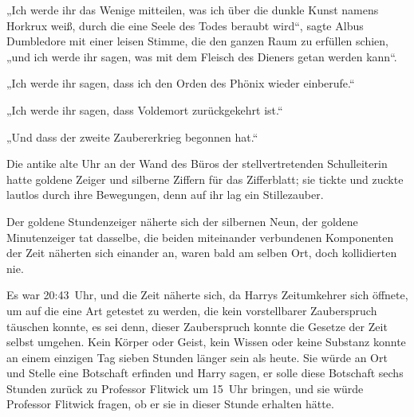 „Ich werde ihr das Wenige mitteilen, was ich über die dunkle Kunst namens Horkrux weiß, durch die eine Seele des Todes beraubt wird“, sagte Albus Dumbledore mit einer leisen Stimme, die den ganzen Raum zu erfüllen schien, „und ich werde ihr sagen, was mit dem Fleisch des Dieners getan werden kann“.

„Ich werde ihr sagen, dass ich den Orden des Phönix wieder einberufe.“

„Ich werde ihr sagen, dass Voldemort zurückgekehrt ist.“

„Und dass der zweite Zaubererkrieg begonnen hat.“


Die antike alte Uhr an der Wand des Büros der stellvertretenden Schulleiterin hatte goldene Zeiger und silberne Ziffern für das Zifferblatt; sie tickte und zuckte lautlos durch ihre Bewegungen, denn auf ihr lag ein Stillezauber.

Der goldene Stundenzeiger näherte sich der silbernen Neun, der goldene Minutenzeiger tat dasselbe, die beiden miteinander verbundenen Komponenten der Zeit näherten sich einander an, waren bald am selben Ort, doch kollidierten nie.

Es war 20:43~Uhr, und die Zeit näherte sich, da Harrys Zeitumkehrer sich öffnete, um auf die eine Art getestet zu werden, die kein vorstellbarer Zauberspruch täuschen konnte, es sei denn, dieser Zauberspruch konnte die Gesetze der Zeit selbst umgehen. Kein Körper oder Geist, kein Wissen oder keine Substanz konnte an einem einzigen Tag sieben Stunden länger sein als heute. Sie würde an Ort und Stelle eine Botschaft erfinden und Harry sagen, er solle diese Botschaft sechs Stunden zurück zu Professor Flitwick um 15~Uhr bringen, und sie würde Professor Flitwick fragen, ob er sie in dieser Stunde erhalten hätte.

